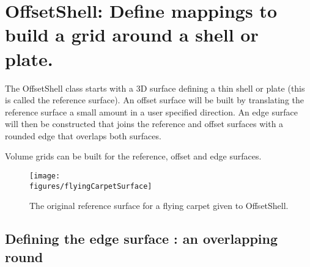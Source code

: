 \section{OffsetShell: Define mappings to build a grid around a shell or plate.}

The OffsetShell class starts with a 3D surface defining a thin shell or plate (this is
called the reference surface).
An offset surface will be built by translating the reference surface a small amount in
a user specified direction.
An edge surface will then be constructed that joins the reference and offset surfaces
with a rounded edge that overlaps both surfaces.

Volume grids can be built for the reference, offset and edge surfaces.

\begin{figure}[h]
  \begin{center}
   \texttt{[image: \\figures/flyingCarpetSurface]} 
   \caption{ The original reference surface for a flying carpet given to OffsetShell.} 
  \end{center} 
\end{figure}

\subsection{Defining the edge surface : an overlapping round}

